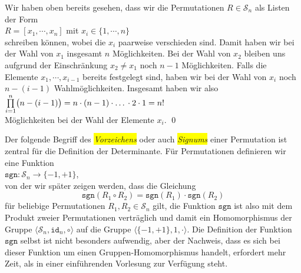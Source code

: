 \proof
Wir haben oben bereits gesehen, dass wir die Permutationen $R \in \mathcal{S}_n$ als Listen der Form
\\[0.2cm]
\hspace*{1.3cm}
$R = [x_1, \cdots, x_n]$ \quad mit $x_i \in \{1,\cdots,n\}$
\\[0.2cm]
schreiben k\"onnen, wobei die $x_i$ paarweise verschieden sind.  Damit haben wir bei der Wahl von
$x_1$ insgesamt $n$ M\"oglichkeiten.  Bei der Wahl von $x_2$ bleiben uns aufgrund der Einschr\"ankung
$x_2 \not= x_1$ noch $n-1$ M\"oglichkeiten.  Falls die Elemente $x_1, \cdots, x_{i-1}$ bereits
festgelegt sind, haben wir bei der Wahl von $x_i$ noch $n - (i - 1)$ Wahlm\"oglichkeiten.   Insgesamt
haben wir also
\\[0.2cm]
\hspace*{1.3cm}
$\prod\limits_{i=1}^n \bigl(n - (i-1)\bigr) = n \cdot (n-1) \cdot \mbox{\dots} \cdot 2 \cdot 1 = n!$
\\[0.2cm]
M\"oglichkeiten bei der Wahl der Elemente $x_i$. \qed 

Der folgende Begriff des \colorbox{yellow}{\emph{Vorzeichens}} oder auch
\colorbox{yellow}{\emph{Signums}} einer Permutation ist zentral f\"ur die  
Definition der Determinante.  F\"ur Permutationen definieren wir eine Funktion
\\[0.2cm]
\hspace*{1.3cm}
$\mathtt{sgn}: \mathcal{S}_n \rightarrow \{-1, +1 \}$,
\\[0.2cm]
von der wir sp\"ater zeigen werden, dass die Gleichung
\begin{equation}
  \label{eq:sgn-homomorph}
  \mathtt{sgn}(R_1 \circ R_2) = \mathtt{sgn}(R_1) \cdot \mathtt{sgn}(R_2) 
\end{equation}
f\"ur beliebige Permutationen $R_1,R_2 \in \mathcal{S}_n$ gilt,  die Funktion $\mathtt{sgn}$ ist also
mit dem Produkt zweier Permutationen vertr\"aglich und damit ein Homomorphismus der Gruppe
$\langle \mathcal{S}_n, \mathtt{id}_n, \circ \rangle$ auf die Gruppe $\langle \{-1,+1\}, 1, \cdot \rangle$.  Die Definition der Funktion $\mathtt{sgn}$ selbst
ist nicht besonders aufwendig,  aber der Nachweis, dass es sich bei dieser Funktion um einen
Gruppen-Homomorphismus handelt, erfordert  mehr Zeit, als in einer einf\"uhrenden Vorlesung zur
Verf\"ugung steht.

